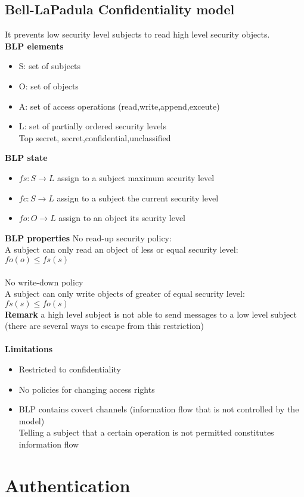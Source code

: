 \documentclass[10pt,a4paper]{book}
\begin{document}
\subsection{Bell-LaPadula Confidentiality model}
It prevents low security level subjects to read high level security objects.\\
\textbf{BLP elements}
\begin{itemize}
\item S: set of subjects
\item O: set of objects
\item A: set of access operations (read,write,append,exceute)
\item L: set of partially ordered security levels\\
Top secret, secret,confidential,unclassified
\end{itemize}
\textbf{BLP state}
\begin{itemize}
\item $fs: S \to L$ assign to a subject maximum security level
\item $fc: S \to L$ assign to a subject the current security level
\item $fo: O \to L$ assign to an object its seurity level
\end{itemize}
\textbf{BLP properties}
No read-up security policy:\\
A subject can only read an object of less or equal security level: $fo(o) \leq fs(s)$\\\\
No write-down policy\\
A subject can only write objects of greater of equal security level: $fs(s) \leq fo(s)$\\
\textbf{Remark} a high level subject is not able to send messages to a low level subject (there are several ways to escape from this restriction)\\\\
\textbf{Limitations}
\begin{itemize}
\item Restricted to confidentiality
\item No policies for changing access rights
\item BLP contains covert channels (information flow that is not controlled by the model)\\
Telling a subject that a certain operation is not permitted constitutes information flow
\end{itemize}
\newpage
\section{Authentication}
\end{document}
